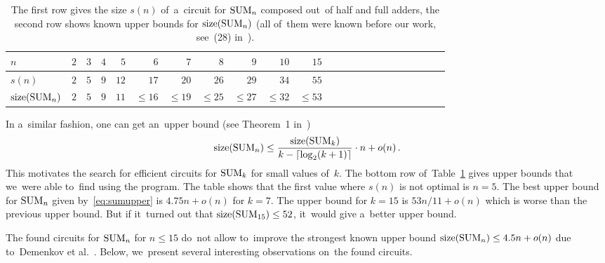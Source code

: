 \begin{table}[!ht]
\begin{center}
\begin{tabular}{lrrrrrrrrrrrrrrrrrrrrrr}
\toprule
$n$ & $2$ & $3$ & $4$ & $5$ & $6$ & $7$ & $8$ & $9$ & $10$ & $15$
\\
\midrule
$s(n)$ &$2$ & $5$ & $9$ & $12$ & $17$ & $20$ & $26$ & $29$& $34$&
$55$
\\
$\operatorname{size}(\operatorname{SUM}_n)$ & $2$ & $5$ & $9$ & $11$
& $\le 16$ & $\le 19$ & $\le 25$ & $\le 27$
& $\le 32$ & $\le 53$
\\
\bottomrule
\end{tabular}
\end{center}
\caption{The first row gives the size $s(n)$ of~a~circuit for $\operatorname{SUM}_n$
composed out~of half and full adders, the second row shows known upper bounds for $\operatorname{size}(\operatorname{SUM}_n)$ (all of~them were known before our work, see~(28) in~\cite{Knuth:2008:ACP:1377542}).}
\label{table:sum}
\end{table}

In a~similar fashion, one can get an~upper bound (see Theorem~1 in~\cite{DBLP:conf/date/Kulikov18})
\begin{equation}\label{eq:sumupper}
\operatorname{size}(\operatorname{SUM}_n) \le \frac{\operatorname{size}(\operatorname{SUM}_k)}{k-\lceil \log_2(k+1) \rceil} \cdot n + o(n) \, .
\end{equation}
This motivates the search for efficient circuits
for $\operatorname{SUM}_k$ for small values of~$k$. The bottom row
of~Table~\ref{table:sum} gives upper bounds that
we~were able to~find using the program.
The table shows that the first value where $s(n)$ is not
optimal is $n=5$. The best upper bound for $\operatorname{SUM}_n$ given
by~\eqref{eq:sumupper} is $4.75n+o(n)$ for $k=7$. The upper
bound for $k=15$ is $53n/11+o(n)$ which is worse than the
previous upper bound. But if it~turned out that
$\operatorname{size}(\operatorname{SUM}_{15}) \le 52$,
it~would give a~better upper bound.

The found circuits for $\operatorname{SUM}_n$ for $n \le 15$
do~not allow to~improve the strongest known upper bound
$\operatorname{size}(\operatorname{SUM}_n) \le 4.5n+o(n)$ due to~Demenkov et al.~\cite{DBLP:journals/ipl/DemenkovKKY10}. Below,
we~present several interesting observations on~the found circuits.

